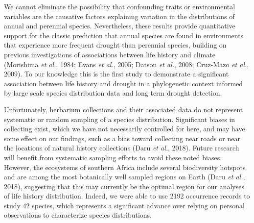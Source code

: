 \documentclass[man,floatsintext]{apa6}
\theoremstyle{definition}
\theoremstyle{definition}
\theoremstyle{definition}
\theoremstyle{remark}
\begin{document}
We cannot eliminate the possibility that confounding traits or
environmental variables are the causative factors explaining variation
in the distributions of annual and perennial species. Nevertheless,
these results provide quantitative support for the classic prediction
that annual species are found in environments that experience more
frequent drought than perennial species, building on previous
investigations of associations between life history and climate
(Morishima \emph{et al.}, 1984; Evans \emph{et al.}, 2005; Datson
\emph{et al.}, 2008; Cruz-Mazo \emph{et al.}, 2009). To our knowledge
this is the first study to demonstrate a significant association between
life history and drought in a phylogenetic context informed by large
scale species distribution data and long term drought detection.

Unfortunately, herbarium collections and their associated data do not
represent systematic or random sampling of a species distribution.
Significant biases in collecting exist, which we have not necessarily
controlled for here, and may have some effect on our findings, such as a
bias toward collecting near roads or near the locations of natural
history collections (Daru \emph{et al.}, 2018). Future research will
benefit from systematic sampling efforts to avoid these noted biases.
However, the ecosystems of southern Africa include several biodiversity
hotspots and are among the most botanically well sampled regions on
Earth (Daru \emph{et al.}, 2018), suggesting that this may currently be
the optimal region for our analyses of life history distribution.
Indeed, we were able to use 2192 occurrence records to study 42 species,
which represents a significant advance over relying on personal
observations to characterize species distributions.
\end{document}
